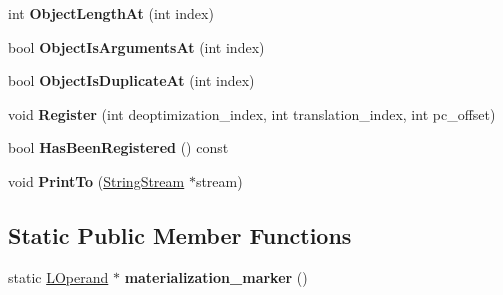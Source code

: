 \begin{DoxyCompactItemize}
\item 
int {\bfseries Object\+Length\+At} (int index)\hypertarget{classv8_1_1internal_1_1_l_environment_acf5114a9aba9bdbc84f96d0aade4ab56}{}\label{classv8_1_1internal_1_1_l_environment_acf5114a9aba9bdbc84f96d0aade4ab56}

\item 
bool {\bfseries Object\+Is\+Arguments\+At} (int index)\hypertarget{classv8_1_1internal_1_1_l_environment_aa49d13a2d0e3fb3cd31643b2b3790431}{}\label{classv8_1_1internal_1_1_l_environment_aa49d13a2d0e3fb3cd31643b2b3790431}

\item 
bool {\bfseries Object\+Is\+Duplicate\+At} (int index)\hypertarget{classv8_1_1internal_1_1_l_environment_a307743c4ab66c027a6e272d88b99f4bb}{}\label{classv8_1_1internal_1_1_l_environment_a307743c4ab66c027a6e272d88b99f4bb}

\item 
void {\bfseries Register} (int deoptimization\+\_\+index, int translation\+\_\+index, int pc\+\_\+offset)\hypertarget{classv8_1_1internal_1_1_l_environment_a17a680dd1eeb25e613e2615eab491b8d}{}\label{classv8_1_1internal_1_1_l_environment_a17a680dd1eeb25e613e2615eab491b8d}

\item 
bool {\bfseries Has\+Been\+Registered} () const \hypertarget{classv8_1_1internal_1_1_l_environment_a69f397b3fadc4d2b426bdde4da1e2296}{}\label{classv8_1_1internal_1_1_l_environment_a69f397b3fadc4d2b426bdde4da1e2296}

\item 
void {\bfseries Print\+To} (\hyperlink{classv8_1_1internal_1_1_string_stream}{String\+Stream} $\ast$stream)\hypertarget{classv8_1_1internal_1_1_l_environment_a5de6c7d68671f32a95b8089cddb4fb62}{}\label{classv8_1_1internal_1_1_l_environment_a5de6c7d68671f32a95b8089cddb4fb62}

\end{DoxyCompactItemize}
\subsection*{Static Public Member Functions}
\begin{DoxyCompactItemize}
\item 
static \hyperlink{classv8_1_1internal_1_1_l_operand}{L\+Operand} $\ast$ {\bfseries materialization\+\_\+marker} ()\hypertarget{classv8_1_1internal_1_1_l_environment_a98d1d56d6d5ada166d49eea0ed9aa8d4}{}\label{classv8_1_1internal_1_1_l_environment_a98d1d56d6d5ada166d49eea0ed9aa8d4}

\end{DoxyCompactItemize}
